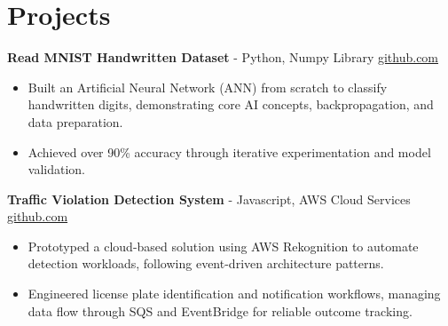 \documentclass[11pt]{article}       %
\begin{document}

\vspace{-18.5pt}

\section*{Projects}

\textbf{Read MNIST Handwritten Dataset}{ - Python, Numpy Library} \hfill \href{https://github.com/Monica20030707/Artificial-Neutral-Network_ML}{github.com} \\
\vspace{-9pt}
\begin{itemize} 
  \item Built an Artificial Neural Network (ANN) from scratch to classify handwritten digits, demonstrating core AI concepts, backpropagation, and data preparation. 
  \item Achieved over 90\% accuracy through iterative experimentation and model validation.
\end{itemize}

\textbf{Traffic Violation Detection System}{ - Javascript, AWS Cloud Services} \hfill \href{https://github.com/Monica20030707/AWS_rekonigition-N-read-database}{github.com} \\
\vspace{-9pt}
\begin{itemize}
  \item Prototyped a cloud-based solution using AWS Rekognition to automate detection workloads, following event-driven architecture patterns.
  \item Engineered license plate identification and notification workflows, managing data flow through SQS and EventBridge for reliable outcome tracking.
\end{itemize}
\end{document}

